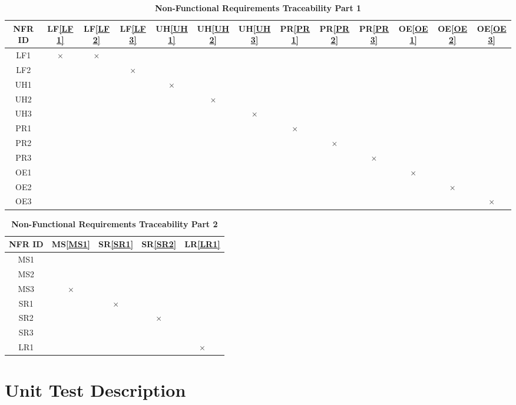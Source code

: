 \documentclass[12pt, titlepage]{article}
\begin{document}
\begin{table}[H]
\centering
\begin{tabular}{|c|c|c|c|c|c|c|c|c|c|c|c|c|}
\hline
 NFR ID & LF\ref{LF1} & LF\ref{LF2} & LF\ref{LF3} & UH\ref{UH1} & UH\ref{UH2} & UH\ref{UH3} & PR\ref{PR1} & PR\ref{PR2} & PR\ref{PR3} & OE\ref{OE1} & OE\ref{OE2} & OE\ref{OE3} \\
\hline
LF1 & $\times$ & $\times$ & & & & & & & & & &\\
\hline
LF2 &  &  & $\times$ & & & & & & & & &\\
\hline
UH1&  & & &$\times$ &  & & & & & & &\\
\hline
UH2 & & & & & $\times$& & & & & & &\\
\hline
UH3 & & & & & &$\times$ & & & & & & \\
\hline
PR1 &  & & & & & & $\times$ & & & & &\\
\hline
PR2 &  & & & & & & & $\times$ & & & &\\
\hline
PR3 &  & & & & & & & & $\times$ & & &\\
\hline
OE1 &  & & & & & & & & & $\times$& &\\
\hline
OE2 &  & & & & & & & & & & $\times$ & \\
\hline
OE3 &  & & & & & & & & & & & $\times$ \\
\hline
\end{tabular}
\caption{\bf Non-Functional Requirements Traceability Part 1}
\end{table}

\begin{table}[H]
\centering
\begin{tabular}{|c|c|c|c|c|}
\hline
NFR ID & MS\ref{MS1} & SR\ref{SR1} & SR\ref{SR2} & LR\ref{LR1} \\
\hline 
MS1 & & & & \\
\hline
MS2 & & & & \\
\hline
MS3 & $\times$ & & & \\
\hline
SR1 & & $\times$& & \\
\hline
SR2 & & & $\times$&  \\
\hline
SR3 & & & & \\
\hline
LR1 & & & & $\times$ \\
\hline
\end{tabular}
\caption{\bf Non-Functional Requirements Traceability Part 2}
\end{table}

\section{Unit Test Description}
\label{section:6}
\end{document}
